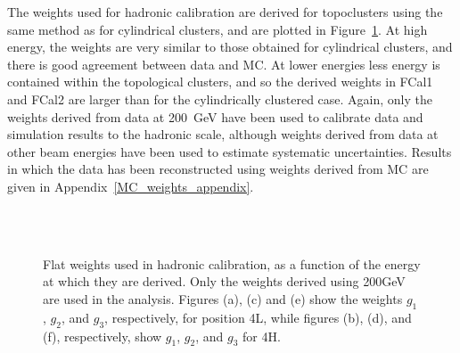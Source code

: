 
The weights used for hadronic calibration are derived for topoclusters using the same method as for cylindrical clusters, and are plotted in Figure~\ref{TBplot_t420_weights}. At high energy, the weights are very similar to those obtained for cylindrical clusters, and there is good agreement between data and MC. At lower energies less energy is contained within the topological clusters, and so the derived weights in FCal1 and FCal2 are larger than for the cylindrically clustered case. Again, only the weights derived from data at 200~GeV have been used to calibrate data and simulation results to the hadronic scale, although weights derived from data at other beam energies have been used to estimate systematic uncertainties. Results in which the data has been reconstructed using weights derived from MC are given in Appendix~\ref{MC_weights_appendix}.


\begin{figure}
\begin{center}
\\
\\
\caption[Flat weights used in hadronic calibration, topoclusters]{Flat weights used in hadronic calibration, as a function of the energy at which they are derived. Only the weights derived using 200GeV are used in the analysis. Figures (a), (c) and (e) show the weights $g_1$, $g_2$, and $g_3$, respectively, for position 4L, while figures (b), (d), and (f), respectively, show  $g_1$, $g_2$, and $g_3$ for 4H. }
\label{TBplot_t420_weights}
\end{center}
\end{figure}



